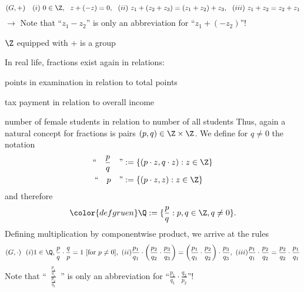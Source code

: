 {	\begin{defi}[group]
		\[
		(G,+)~~~ (i)~0\in\Z,~~ z+(-z)=0,~~ (ii)~z_1+(z_2+z_3)=(z_1+z_2)+z_3,~~ (iii)~z_1+z_2=z_2+z_1
		\]
		$\rightarrow$ Note that ``$z_1-z_2$'' is only an abbreviation for ``$z_1+(-z_2)$''!
	\end{defi}

	{\color{satzrot} $\Z$ equipped with + is a group }
	
	

	In real life, fractions exist again in relations:
	\ite
	\item points in examination in relation to total points\\[-0.8cm]
	\item tax payment in relation to overall income\\[-0.8cm]
	\item number of female students in relation to number of all students
	\eti
	Thus, again a natural concept for fractions is pairs $(p,q)\in\Z\times\Z$. We define for $q\neq 0$ the notation
	\vspace{-0.5cm}\color{defgruen}
	\begin{align*}
	\text{``}\quad \frac{p}{q}\quad \text{''} &:= \{(p\cdot z,q\cdot z): z\in\Z\}\\
	\text{``}\quad p \quad \text{''} &:= \{(p\cdot z,z): z\in\Z\}
	\end{align*}
	\color{black}
	and therefore $$\color{defgruen} \Q:=\{\frac{p}{q}: p,q\in\Z, q\neq 0\}.$$
	Defining multiplication by componentwise product, we arrive at the rules
	{\color{satzrot}
		\[ (G,\cdot) ~~(i)
		1\in\Q, \frac{p}{q}\cdot\frac{q}{p} =1\text{ [for $p\neq0$]}, 
		~(ii)\frac{p_1}{q_1}\cdot \left(\frac{p_2}{q_2}\cdot\frac{p_3}{q_3}\right)=\left(\frac{p_1}{q_1}\cdot \frac{p_2}{q_2}\right)\cdot\frac{p_3}{q_3},
		~(iii) \frac{p_1}{q_1}\cdot \frac{p_2}{q_2}=\frac{p_2}{q_2}\cdot \frac{p_1}{q_1}
		\]
		Note that ``\ $\frac{\frac{p_1}{q_1}}{\frac{p_2}{q_2}}$\ '' is only an abbreviation for ``$\frac{p_1}{q_1}\cdot \frac{q_2}{p_2}$''!}
	
}
